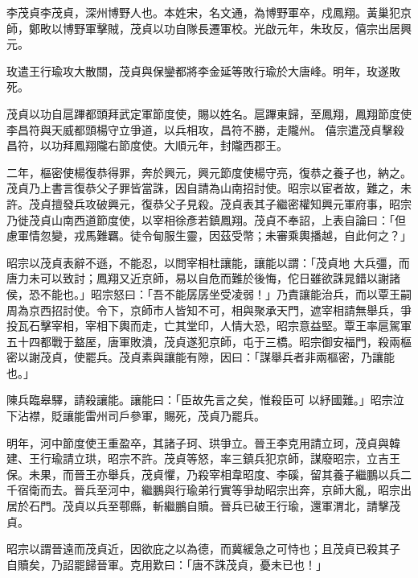 
\begin{pinyinscope}

 李茂貞李茂貞，深州博野人也。本姓宋，名文通，為博野軍卒，戍鳳翔。黃巢犯京師，鄭畋以博野軍擊賊，茂貞以功自隊長遷軍校。光啟元年，朱玫反，僖宗出居興元。



 玫遣王行瑜攻大散關，茂貞與保鑾都將李金延等敗行瑜於大唐峰。明年，玫遂敗死。



 茂貞以功自扈蹕都頭拜武定軍節度使，賜以姓名。扈蹕東歸，至鳳翔，鳳翔節度使李昌符與天威都頭楊守立爭道，以兵相攻，昌符不勝，走隴州。
 僖宗遣茂貞擊殺昌符，以功拜鳳翔隴右節度使。大順元年，封隴西郡王。



 二年，樞密使楊復恭得罪，奔於興元，興元節度使楊守亮，復恭之養子也，納之。茂貞乃上書言復恭父子罪皆當誅，因自請為山南招討使。昭宗以宦者故，難之，未許。茂貞擅發兵攻破興元，復恭父子見殺。茂貞表其子繼密權知興元軍府事，昭宗乃徙茂貞山南西道節度使，以宰相徐彥若鎮鳳翔。茂貞不奉詔，上表自論曰：「但慮軍情忽變，戎馬難羈。徒令甸服生靈，因茲受幣；未審乘輿播越，自此何之？」



 昭宗以茂貞表辭不遜，不能忍，以問宰相杜讓能，讓能以謂：「茂貞地
 大兵彊，而唐力未可以致討；鳳翔又近京師，易以自危而難於後悔，佗日雖欲誅晁錯以謝諸侯，恐不能也。」昭宗怒曰：「吾不能孱孱坐受凌弱！」乃責讓能治兵，而以覃王嗣周為京西招討使。令下，京師市人皆知不可，相與聚承天門，遮宰相請無舉兵，爭投瓦石擊宰相，宰相下輿而走，亡其堂印，人情大恐，昭宗意益堅。覃王率扈駕軍五十四都戰于盩厔，唐軍敗潰，茂貞遂犯京師，屯于三橋。昭宗御安福門，殺兩樞密以謝茂貞，使罷兵。茂貞素與讓能有隙，因曰：「謀舉兵者非兩樞密，乃讓能也。」



 陳兵臨皋驛，請殺讓能。讓能曰：「臣故先言之矣，惟殺臣可
 以紓國難。」昭宗泣下沾襟，貶讓能雷州司戶參軍，賜死，茂貞乃罷兵。



 明年，河中節度使王重盈卒，其諸子珂、珙爭立。晉王李克用請立珂，茂貞與韓建、王行瑜請立珙，昭宗不許。茂貞等怒，率三鎮兵犯京師，謀廢昭宗，立吉王保。未果，而晉王亦舉兵，茂貞懼，乃殺宰相韋昭度、李磎，留其養子繼鵬以兵二千宿衛而去。晉兵至河中，繼鵬與行瑜弟行實等爭劫昭宗出奔，京師大亂，昭宗出居於石門。茂貞以兵至鄠縣，斬繼鵬自贖。晉兵已破王行瑜，還軍渭北，請擊茂貞。



 昭宗以謂晉遠而茂貞近，因欲庇之以為德，而冀緩急之可恃也；且茂貞已殺其子
 自贖矣，乃詔罷歸晉軍。克用歎曰：「唐不誅茂貞，憂未已也！」




\end{pinyinscope}
